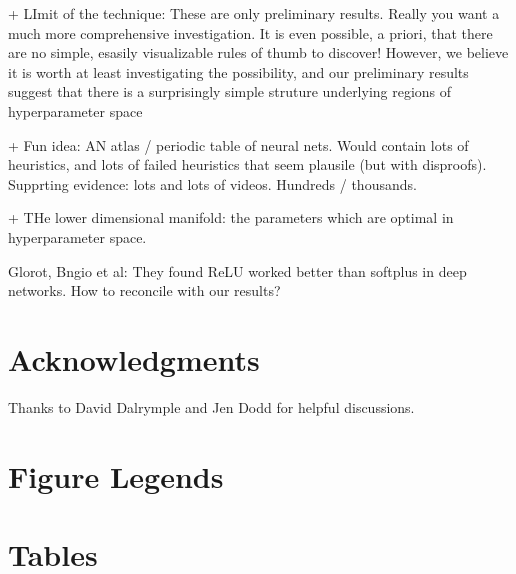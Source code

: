\documentclass[10pt]{article}
\begin{document}
+ LImit of the technique: These are only preliminary results.  Really
you want a much more comprehensive investigation.  It is even
possible, a priori, that there are no simple, esasily visualizable
rules of thumb to discover!  However, we believe it is worth at least
investigating the possibility, and our preliminary results suggest
that there is a surprisingly simple struture underlying regions of
hyperparameter space

+ Fun idea: AN atlas / periodic table of neural nets.  Would contain
lots of heuristics, and lots of failed heuristics that seem plausile
(but with disproofs).  Supprting evidence: lots and lots of videos.
Hundreds / thousands.

+ THe lower dimensional manifold: the parameters which are optimal in
hyperparameter space.


Glorot, Bngio et al: They found ReLU worked better than softplus in
deep networks.  How to reconcile with our results?

\section*{Acknowledgments}

Thanks to David Dalrymple and Jen Dodd for helpful discussions.



\section*{Figure Legends}


\section*{Tables}
\end{document}
